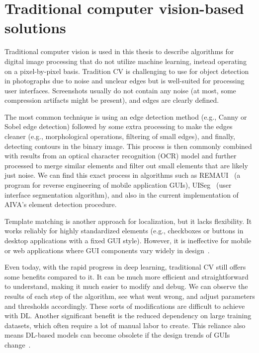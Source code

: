 \documentclass[
  digital,     %
  oneside,     %
  nosansbold,  %
  nocolorbold, %
  lof,         %
  lot,         %
]{fithesis4}
\begin{document}
\section{Traditional computer vision-based solutions}

Traditional computer vision is used in this thesis to describe algorithms for digital image processing that do not utilize machine learning, instead operating on a pixel-by-pixel basis. Tradition CV is challenging to use for object detection in photographs due to noise and unclear edges but is well-suited for processing user interfaces. Screenshots usually do not contain any noise (at most, some compression artifacts might be present), and edges are clearly defined.

The most common technique is using an edge detection method (e.g., Canny or Sobel edge detection) followed by some extra processing to make the edges cleaner (e.g., morphological operations, filtering of small edges), and finally, detecting contours in the binary image. This process is then commonly combined with results from an optical character recognition (OCR) model and further processed to merge similar elements and filter out small elements that are likely just noise. We can find this exact process in algorithms such as REMAUI~\cite{remaui} (a program for reverse engineering of mobile application GUIs), UISeg~\cite{uiseg} (user interface segmentation algorithm), and also in the current implementation of AIVA's element detection procedure.

Template matching is another approach for localization, but it lacks flexibility. It works reliably for highly standardized elements (e.g., checkboxes or buttons in desktop applications with a fixed GUI style). However, it is ineffective for mobile or web applications where GUI components vary widely in design~\cite{ODforGUI_CV_DL_or_both}.

Even today, with the rapid progress in deep learning, traditional CV still offers some benefits compared to it. It can be much more efficient and straightforward to understand, making it much easier to modify and debug. We can observe the results of each step of the algorithm, see what went wrong, and adjust parameters and thresholds accordingly. These sorts of modifications are difficult to achieve with DL. Another significant benefit is the reduced dependency on large training datasets, which often require a lot of manual labor to create. This reliance also means DL-based models can become obsolete if the design trends of GUIs change~\cite{DLvsTCV}.
\end{document}
